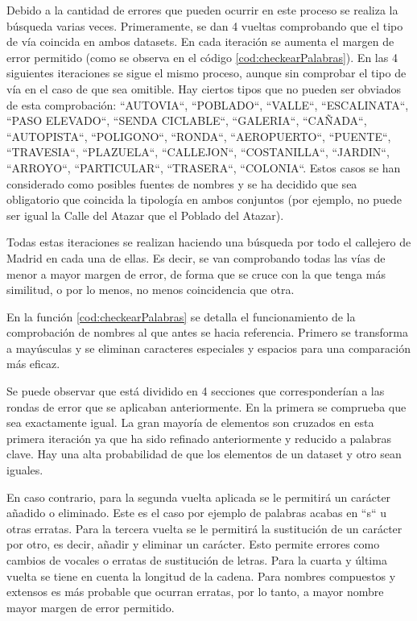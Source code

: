 Debido a la cantidad de errores que pueden ocurrir en este proceso se realiza la búsqueda varias veces. Primeramente, se dan 4 vueltas comprobando que el tipo de vía coincida en ambos datasets. En cada iteración se aumenta el margen de error permitido (como se observa en el código \ref{cod:checkearPalabras}). En las 4 siguientes iteraciones se sigue el mismo proceso, aunque sin comprobar el tipo de vía en el caso de que sea omitible. Hay ciertos tipos que no pueden ser obviados de esta comprobación: ``AUTOVIA``, ``POBLADO``, ``VALLE``, ``ESCALINATA``, ``PASO ELEVADO``, ``SENDA CICLABLE``, ``GALERIA``, ``CAÑADA``, ``AUTOPISTA``, ``POLIGONO``, ``RONDA``, ``AEROPUERTO``, ``PUENTE``, ``TRAVESIA``, ``PLAZUELA``, ``CALLEJON``, ``COSTANILLA``, ``JARDIN``, ``ARROYO``, ``PARTICULAR``, ``TRASERA``, ``COLONIA``. Estos casos se han considerado como posibles fuentes de nombres y se ha decidido que sea obligatorio que coincida la tipología en ambos conjuntos (por ejemplo, no puede ser igual la Calle del Atazar que el Poblado del Atazar).

Todas estas iteraciones se realizan haciendo una búsqueda por todo el callejero de Madrid en cada una de ellas. Es decir, se van comprobando todas las vías de menor a mayor margen de error, de forma que se cruce con la que tenga más similitud, o por lo menos, no menos coincidencia que otra.




En la función \ref{cod:checkearPalabras} se detalla el funcionamiento de la comprobación de nombres al que antes se hacia referencia.
Primero se transforma a mayúsculas y se eliminan caracteres especiales y espacios para una comparación más eficaz.

Se puede observar que está dividido en 4 secciones que corresponderían a las rondas de error que se aplicaban anteriormente.
En la primera se comprueba que sea exactamente igual. La gran mayoría de elementos son cruzados en esta primera iteración ya que ha sido refinado anteriormente y reducido a palabras clave. Hay una alta probabilidad de que los elementos de un dataset y otro sean iguales.

En caso contrario, para la segunda vuelta aplicada se le permitirá un carácter añadido o eliminado. Este es el caso por ejemplo de palabras acabas en ``s`` u otras erratas. Para la tercera vuelta se le permitirá la sustitución de un carácter por otro, es decir, añadir y eliminar un carácter. Esto permite errores como cambios de vocales o erratas de sustitución de letras. Para la cuarta y última vuelta se tiene en cuenta la longitud de la cadena. Para nombres compuestos y extensos es más probable que ocurran erratas, por lo tanto, a mayor nombre mayor margen de error permitido.

